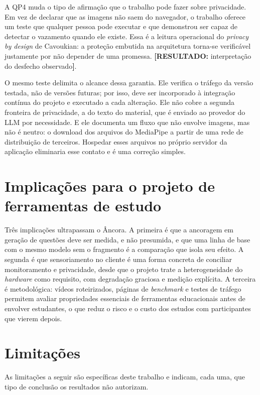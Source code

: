 \documentclass[portuguese,oneside]{tcc}
\newcommand{\ferramenta}{Âncora\xspace}
\newcommand{\estr}[1]{\emph{#1}}
\newcommand{\resultado}[1]{\textcolor{red!70!black}{\textbf{[RESULTADO:} #1\textbf{]}}}
\begin{document}
A QP4 muda o tipo de afirmação que o trabalho pode fazer sobre privacidade. Em vez de declarar que as imagens não saem do navegador, o trabalho oferece um teste que qualquer pessoa pode executar e que demonstrou ser capaz de detectar o vazamento quando ele existe. Essa é a leitura operacional do \estr{privacy by design} de Cavoukian: a proteção embutida na arquitetura torna-se verificável justamente por não depender de uma promessa. \resultado{interpretação do desfecho observado}.

O mesmo teste delimita o alcance dessa garantia. Ele verifica o tráfego da versão testada, não de versões futuras; por isso, deve ser incorporado à integração contínua do projeto e executado a cada alteração. Ele não cobre a segunda fronteira de privacidade, a do texto do material, que é enviado ao provedor do LLM por necessidade. E ele documenta um fluxo que não envolve imagens, mas não é neutro: o download dos arquivos do MediaPipe a partir de uma rede de distribuição de terceiros. Hospedar esses arquivos no próprio servidor da aplicação eliminaria esse contato e é uma correção simples.

\section{Implicações para o projeto de ferramentas de estudo}

Três implicações ultrapassam o \ferramenta. A primeira é que a ancoragem em geração de questões deve ser medida, e não presumida, e que uma linha de base com o mesmo modelo sem o fragmento é a comparação que isola seu efeito. A segunda é que sensoriamento no cliente é uma forma concreta de conciliar monitoramento e privacidade, desde que o projeto trate a heterogeneidade do \estr{hardware} como requisito, com degradação graciosa e medição explícita. A terceira é metodológica: vídeos roteirizados, páginas de \estr{benchmark} e testes de tráfego permitem avaliar propriedades essenciais de ferramentas educacionais antes de envolver estudantes, o que reduz o risco e o custo dos estudos com participantes que vierem depois.

\section{\label{sec:limitacoes}Limitações}

As limitações a seguir são específicas deste trabalho e indicam, cada uma, que tipo de conclusão os resultados não autorizam.
\end{document}
